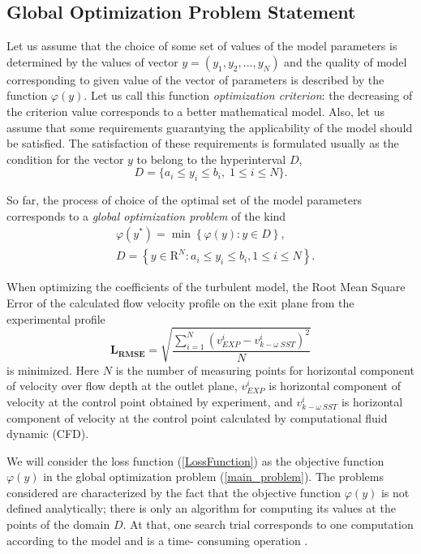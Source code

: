 \documentclass[sensors,article,submit,moreauthors,pdftex]{Definitions/mdpi}
\begin{document}



\subsection{Global Optimization Problem Statement}
Let us assume that the choice of some set of values of the model parameters is determined by the values of vector $y=(y_1,y_2,...,y_N)$ and the quality of model corresponding to given value of the vector of parameters is described by the function $\varphi(y)$. Let us call this function \textit{optimization criterion}: the decreasing of the criterion value corresponds to a better mathematical model. Also, let us assume that some requirements guarantying the applicability of the model should be satisfied. The satisfaction of these requirements is formulated usually as the condition for the vector $y$ to belong to the hyperinterval $D$,
\[
D=\{a_i \leq y_i \leq b_i, \; 1 \leq i \leq N\}.
\]

So far, the process of choice of the optimal set of the model parameters corresponds to a \textit{global optimization problem} of the kind
\begin{eqnarray}\label{main_problem}
& \varphi(y^\ast)=\min{\left\{\varphi(y):y\in D\right\}},\\
& D=\left\{y\in \text{R}^N: a_i\leq y_i \leq b_i, 1\leq i \leq N\right\}. \nonumber
\end{eqnarray}

When optimizing the coefficients of the turbulent model, the Root Mean Square Error of the calculated flow velocity profile on the exit plane from the experimental profile 
\begin{equation}
	\label{LossFunction}
	\boldsymbol{L_{RMSE}} = \sqrt{\frac{\sum\limits_{i=1}^{N} \left( v_{EXP}^i - v_{k-\omega\ SST}^i \right)^2}{N}}
\end{equation}
is minimized. 
Here $N$ is the number of measuring points for horizontal component of velocity over flow depth at the outlet plane, $v_{EXP}^i$ is horizontal component of velocity at the control point obtained by experiment, and $v_{k-\omega\ SST}^i$  is horizontal component of velocity at the control point calculated by computational fluid dynamic (CFD). 

We will consider the loss function (\ref{LossFunction}) as the objective function $\varphi(y)$ in the global optimization problem (\ref{main_problem}). 
The problems considered are characterized by the fact that the objective function $\varphi(y)$ is not defined analytically; there is only an algorithm for computing its values at the points of the domain $D$. At that, one search trial corresponds to one computation according to the model and is a time- consuming operation \cite{Kalyulin2017,Paulavicius2020}.
\end{document}
